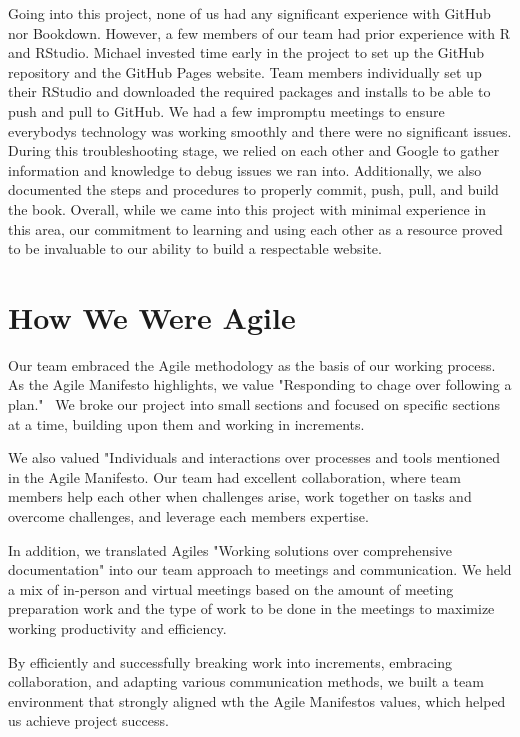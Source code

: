 \documentclass[
]{book}
\begin{document}
Going into this project, none of us had any significant experience with GitHub nor Bookdown. However, a few members of our team had prior experience with R and RStudio. Michael invested time early in the project to set up the GitHub repository and the GitHub Pages website. Team members individually set up their RStudio and downloaded the required packages and installs to be able to push and pull to GitHub. We had a few impromptu meetings to ensure everybody\textquotesingle s technology was working smoothly and there were no significant issues. During this troubleshooting stage, we relied on each other and Google to gather information and knowledge to debug issues we ran into. Additionally, we also documented the steps and procedures to properly commit, push, pull, and build the book. Overall, while we came into this project with minimal experience in this area, our commitment to learning and using each other as a resource proved to be invaluable to our ability to build a respectable website.

\hypertarget{how-we-were-agile}{%
\section{How We Were Agile}\label{how-we-were-agile}}

Our team embraced the Agile methodology as the basis of our working process. As the Agile Manifesto highlights, we value "Responding to chage over following a plan."~ We broke our project into small sections and focused on specific sections at a time, building upon them and working in increments.~

We also valued "Individuals and interactions over processes and tools\textquotesingle\textquotesingle{} mentioned in the Agile Manifesto. Our team had excellent collaboration, where team members help each other when challenges arise, work together on tasks and overcome challenges, and leverage each member\textquotesingle s expertise.

In addition, we translated Agile\textquotesingle s "Working solutions over comprehensive documentation" into our team approach to meetings and communication. We held a mix of in-person and virtual meetings based on the amount of meeting preparation work and the type of work to be done in the meetings to maximize working productivity and efficiency.

By efficiently and successfully breaking work into increments, embracing collaboration, and adapting various communication methods, we built a team environment that strongly aligned wth the Agile Manifesto\textquotesingle s values, which helped us achieve project success.
\end{document}
